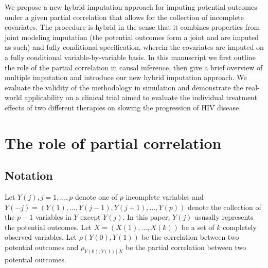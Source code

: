 	We propose a new hybrid imputation approach for imputing potential outcomes under a given partial correlation that allows for the collection of incomplete covariates. The procedure is hybrid in the sense that it combines properties from joint modeling imputation (the potential outcomes form a joint and are imputed as such) and fully conditional specification, wherein the covariates are imputed on a fully conditional variable-by-variable basis. In this manuscript we first outline the role of the partial correlation in causal inference, then give a brief overview of multiple imputation and introduce our new hybrid imputation approach. We evaluate the validity of the methodology in simulation and demonstrate the real-world applicability on a clinical trial aimed to evaluate the individual treatment effects of two different therapies on slowing the progression of HIV disease.	
	
	
	\section{The role of partial correlation}
	\label{sec:4.2}
	\subsection{Notation}
		Let ${Y(j), j = 1, \dots, p}$ denote one of $p$ incomplete variables and $Y(-j) = (Y(1), \dots, Y(j-1), Y(j+1), \dots, Y(p))$ denote the collection of the $p-1$ variables in $Y$ except $Y(j)$. In this paper, $Y(j)$ ususally represents the potential outcomes. Let $X = (X(1), \dots, X(k))$ be a set of $k$ completely observed variables. Let $\rho(Y(0), Y(1))$ be the correlation between two potential outcomes and $\rho_{Y(0), Y(1)\,|\ X}$ be the partial correlation between two potential outcomes. 
